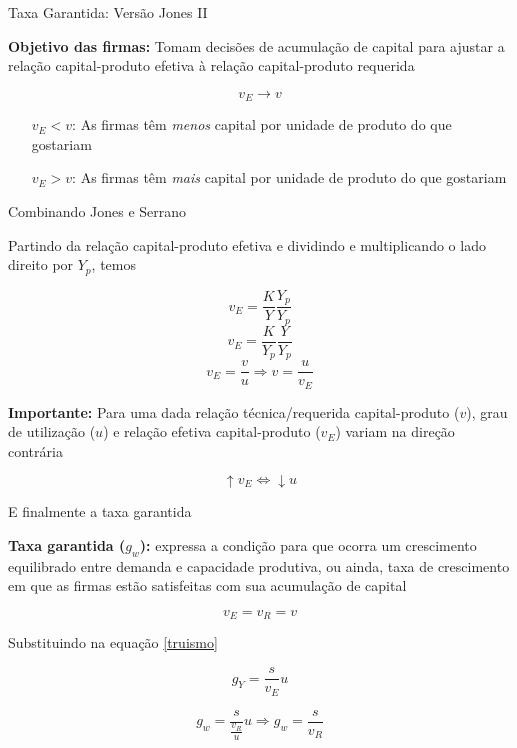 \documentclass[10pt]{beamer}
\begin{document}
\begin{frame}{Taxa Garantida: Versão Jones II}

\textbf{Objetivo das firmas:} Tomam decisões de acumulação de capital para
ajustar a relação capital-produto efetiva à relação capital-produto requerida

$$
v_E \to v
$$

\begin{itemize}
\item[$v_E<v$:] As firmas têm \textit{menos} capital por unidade de produto do que gostariam
\item[$v_E>v$:] As firmas têm \textit{mais} capital por unidade de produto do que gostariam
\end{itemize}
\end{frame}

\begin{frame}{Combinando Jones e Serrano}

Partindo da relação capital-produto efetiva e dividindo e multiplicando o lado direito por $Y_p$, temos

$$
v_E = \frac{K}{Y}\frac{Y_p}{Y_p}
$$
$$
v_E = \frac{K}{Y_p}\frac{Y}{Y_p}
$$
$$
v_E = \frac{v}{u} \Rightarrow v = \frac{u}{v_E}
$$

\textbf{Importante:} Para uma dada relação técnica/requerida capital-produto ($v$), grau de utilização ($u$) e relação efetiva capital-produto ($v_E$) variam na direção contrária

$$
\uparrow v_E \Leftrightarrow \downarrow u
$$
\end{frame}

\begin{frame}{E finalmente a taxa garantida}

\textbf{Taxa garantida ($g_w$):} expressa a condição para que ocorra um crescimento equilibrado entre demanda e capacidade produtiva, ou ainda, taxa de crescimento em que as firmas estão satisfeitas com sua acumulação de capital

$$
v_E = v_R = v
$$

Substituindo na equação \ref{truismo}

$$
g_Y = \frac{s}{v_E}u 
$$

$$
g_w = \frac{s}{\frac{v_R}{u}}u \Rightarrow g_w = \frac{s}{v_R}
$$
\end{frame}
\end{document}
